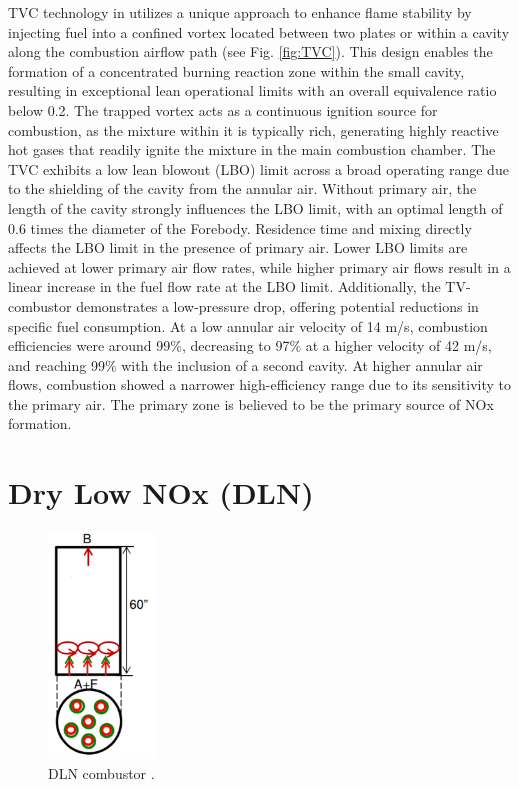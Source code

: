 TVC technology in \cite{TVC5266} utilizes a unique approach to enhance flame stability by injecting fuel into a confined vortex located between two plates or within a cavity along the combustion airflow path (see Fig. \ref{fig:TVC}). This design enables the formation of a concentrated burning reaction zone within the small cavity, resulting in exceptional lean operational limits with an overall equivalence ratio below 0.2\cite{VAThesis2011}. 
The trapped vortex acts as a continuous ignition source for combustion, as the mixture within it is typically rich\cite{VAThesis2011}, generating highly reactive hot gases that readily ignite the mixture in the main combustion chamber\cite{VAThesis2011}.
The TVC exhibits a low lean blowout (LBO) limit across a broad operating range due to the shielding of the cavity from the annular air. Without primary air, the length of the cavity strongly influences the LBO limit, with an optimal length of 0.6 times the diameter of the Forebody. Residence time and mixing directly affects the LBO limit in the presence of primary air.
Lower LBO limits are achieved at lower primary air flow rates, while higher primary air flows result in a linear increase in the fuel flow rate at the LBO limit. Additionally, the TV-combustor demonstrates a low-pressure drop, offering potential reductions in specific fuel consumption. At a low annular air velocity of 14 m/s, combustion efficiencies were around 99$\%$, decreasing to 97$\%$ at a higher velocity of 42 m/s, and reaching 99$\%$ with the inclusion of a second cavity. At higher annular air flows, combustion showed a narrower high-efficiency range due to its sensitivity to the primary air. The primary zone is believed to be the primary source of NOx formation.

\newpage
\section{Dry Low NOx (DLN)}
\vspace{-5mm}
\begin{figure}
\vspace{-12mm}
    \centering    \includegraphics[width=0.25\textwidth]{Chapter2/Images/DLN.jpeg}
    \caption[DLN combustor]{DLN combustor \cite{SKG2017}.}
    \label{fig:DLN}
\end{figure}

